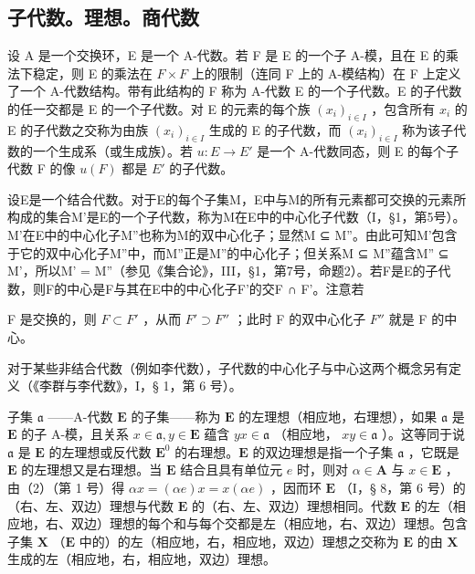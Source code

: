 \subsection{子代数。理想。商代数}

设 A 是一个交换环，E 是一个 A-代数。若 F 是 E 的一个子 A-模，且在 E 的乘法下稳定，则 E 的乘法在 \(F \times F\) 上的限制（连同 F 上的 A-模结构）在 F 上定义了一个 A-代数结构。带有此结构的 F 称为 A-代数 E 的一个子代数。E 的子代数的任一交都是 E 的一个子代数。对 E 的元素的每个族 \((x_{i})_{i \in I}\) ，包含所有 \(x_{i}\) 的 E 的子代数之交称为由族 \((x_{i})_{i \in I}\) 生成的 E 的子代数，而 \((x_{i})_{i \in I}\) 称为该子代数的一个生成系（或生成族）。若 \(u: E \to E'\) 是一个 A-代数同态，则 E 的每个子代数 F 的像 \(u(F)\) 都是 \(E'\) 的子代数。

设E是一个结合代数。对于E的每个子集M，E中与M的所有元素都可交换的元素所构成的集合M'是E的一个子代数，称为M在E中的中心化子代数（I，§1，第5号）。M'在E中的中心化子M''也称为M的双中心化子；显然M ⊆ M''。由此可知M'包含于它的双中心化子M''中，而M''正是M''的中心化子；但关系M ⊆ M''蕴含M'' ⊆ M'，所以M' = M''（参见《集合论》，III，§1，第7号，命题2）。若F是E的子代数，则F的中心是F与其在E中的中心化子F'的交F ∩ F'。注意若

F 是交换的，则 \(F \subset F'\) ，从而 \(F' \supset F''\) ；此时 F 的双中心化子 \(F''\) 就是 F 的中心。

对于某些非结合代数（例如李代数），子代数的中心化子与中心这两个概念另有定义（《李群与李代数》，I，§ 1，第 6 号）。

子集 \(\mathfrak{a}\) ——A-代数 \(\mathbf{E}\) 的子集——称为 \(\mathbf{E}\) 的左理想（相应地，右理想），如果 \(\mathfrak{a}\) 是 \(\mathbf{E}\) 的子 A-模，且关系 \(x \in \mathfrak{a}, y \in \mathbf{E}\) 蕴含 \(yx \in \mathfrak{a}\) （相应地， \(xy \in \mathfrak{a}\) ）。这等同于说 \(\mathfrak{a}\) 是 \(\mathbf{E}\) 的左理想或反代数 \(\mathbf{E}^0\) 的右理想。\(\mathbf{E}\) 的双边理想是指一个子集 \(\mathfrak{a}\) ，它既是 \(\mathbf{E}\) 的左理想又是右理想。当 \(\mathbf{E}\) 结合且具有单位元 \(e\) 时，则对 \(\alpha \in \mathbf{A}\) 与 \(x \in \mathbf{E}\) ，由（2）（第 1 号）得 \(\alpha x = (\alpha e)x = x(\alpha e)\) ，因而环 \(\mathbf{E}\) （I，§ 8，第 6 号）的（右、左、双边）理想与代数 \(\mathbf{E}\) 的（右、左、双边）理想相同。代数 \(\mathbf{E}\) 的左（相应地，右、双边）理想的每个和与每个交都是左（相应地，右、双边）理想。包含子集 \(\mathbf{X}\) （\(\mathbf{E}\) 中的）的左（相应地，右，相应地，双边）理想之交称为 \(\mathbf{E}\) 的由 \(\mathbf{X}\) 生成的左（相应地，右，相应地，双边）理想。

